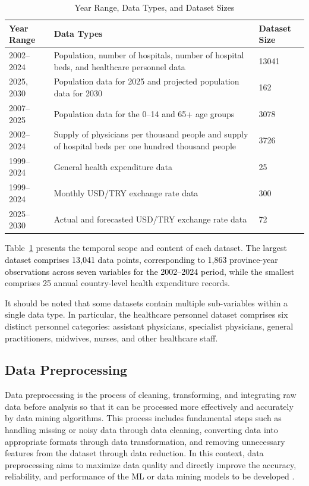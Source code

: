 \documentclass[final, 9pt, twocolumn]{saucis}
\newcommand{\rev}[1]{\textcolor{black}{#1}}
\begin{document}
\begin{table}[htbp]
\centering
\caption{Year Range, Data Types, and Dataset Sizes}
\label{tab:sources2}
\small
\begin{tabular}{p{1.8cm} p{4.5cm} p{1.2cm}}
\hline
\textbf{Year Range} & \textbf{Data Types} & \textbf{Dataset Size} \\
\hline
2002--2024 & Population, number of hospitals, number of hospital beds, and healthcare personnel data & 13041 \\
2025, 2030 & Population data for 2025 and projected population data for 2030 & 162 \\
2007--2025 & Population data for the 0--14 and 65+ age groups & 3078 \\
2002--2024 & Supply of physicians per thousand people and supply of hospital beds per one hundred thousand people & 3726 \\
1999--2024 & General health expenditure data & 25 \\
1999--2024 & Monthly USD/TRY exchange rate data & 300 \\
2025--2030 & Actual and forecasted USD/TRY exchange rate data & 72 \\
\hline
\end{tabular}
\end{table}

Table~\ref{tab:sources2} presents the temporal scope and content of each dataset. \rev{The largest dataset comprises 13,041 data points, corresponding to 1,863 province-year observations across seven variables for the 2002--2024 period}, while the smallest comprises 25 annual country-level health expenditure records.

It should be noted that some datasets contain multiple sub-variables within a single data type. In particular, the healthcare personnel dataset comprises six distinct personnel categories: assistant physicians, specialist physicians, general practitioners, midwives, nurses, and other healthcare staff.

\subsection{Data Preprocessing}
Data preprocessing is the process of cleaning, transforming, and integrating raw data before analysis so that it can be processed more effectively and accurately by data mining algorithms. This process includes fundamental steps such as handling missing or noisy data through data cleaning, converting data into appropriate formats through data transformation, and removing unnecessary features from the dataset through data reduction. In this context, data preprocessing aims to maximize data quality and directly improve the accuracy, reliability, and performance of the ML or data mining models to be developed \cite{method2}.
\end{document}
